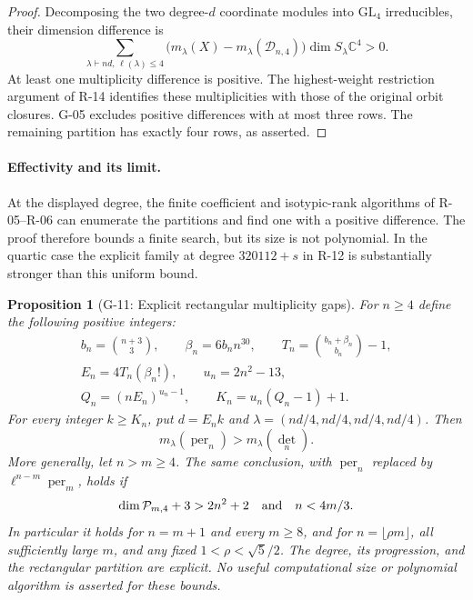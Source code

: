 \documentclass[11pt,a4paper]{article}
\newtheorem{proposition}{Proposition}
\theoremstyle{definition}\newtheorem{definition}{Definition}
\begin{document}
\begin{proof}
Decomposing the two degree-$d$ coordinate modules into
$\mathrm{GL}_4$ irreducibles, their dimension difference is
\[
 \sum_{\lambda\vdash nd,\,\ell(\lambda)\leq4}
 \bigl(m_\lambda(X)-m_\lambda(\mathcal D_{n,4})\bigr)
 \dim S_\lambda\mathbb C^4>0.
\]
At least one multiplicity difference is positive. The
highest-weight restriction argument of R-14 identifies these
multiplicities with those of the original orbit closures.
G-05 excludes positive differences with at most three rows.
The remaining partition has exactly four rows, as asserted.
\end{proof}
\paragraph{Effectivity and its limit.}
At the displayed degree, the finite coefficient and isotypic-rank
algorithms of R-05--R-06 can enumerate the partitions and find one
with a positive difference. The proof therefore bounds a finite
search, but its size is not polynomial. In the quartic case the
explicit family at degree $320112+s$ in R-12 is substantially
stronger than this uniform bound.


\begin{proposition}[G-11: Explicit rectangular multiplicity gaps]\label{G-11}
For $n\geq4$ define the following positive integers:
\[
\begin{gathered}
 b_n=\binom{n+3}{3},\qquad \beta_n=6b_n n^{30},\qquad
 T_n=\binom{b_n+\beta_n}{b_n}-1,\\
 E_n=4T_n(\beta_n!),\qquad u_n=2n^2-13,\\
 Q_n=(nE_n)^{u_n-1},\qquad K_n=u_n(Q_n-1)+1.
\end{gathered}
\]
For every integer $k\geq K_n$, put $d=E_n k$ and
$\lambda=(nd/4,nd/4,nd/4,nd/4)$. Then
\begin{equation}\label{G11:rectangle}
 m_\lambda(\operatorname{per}_n)>m_\lambda(\det_n).
\end{equation}
More generally, let $n>m\geq4$. The same conclusion, with
$\operatorname{per}_n$ replaced by
$\ell^{n-m}\operatorname{per}_m$, holds if
\begin{equation}\label{G11:padded-hypotheses}
 \dim\mathcal P_{m,4}+3>2n^2+2
 \quad\hbox{and}\quad n<4m/3.
\end{equation}
In particular it holds for $n=m+1$ and every $m\geq8$, and
for $n=\lfloor\rho m\rfloor$, all sufficiently large $m$,
and any fixed $1<\rho<\sqrt5/2$.
The degree, its progression, and the rectangular partition are
explicit. No useful computational size or polynomial algorithm
is asserted for these bounds.
\end{proposition}
\end{document}
